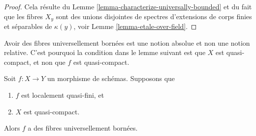 \begin{proof}
Cela résulte du
Lemme \ref{lemma-characterize-universally-bounded} et du fait que les fibres
$X_y$ sont des unions disjointes de spectres d'extensions
de corps finies et séparables de $\kappa(y)$,
voir Lemme \ref{lemma-etale-over-field}.
\end{proof}

\noindent
Avoir des fibres universellement bornées est une notion absolue et non une notion relative.
C'est pourquoi la condition dans le lemme suivant est que $X$ est quasi-compact,
et non que $f$ est quasi-compact.

\begin{lemma}
\label{lemma-locally-quasi-finite-qc-source-universally-bounded}
Soit $f : X \to Y$ un morphisme de schémas. Supposons
que
\begin{enumerate}
\item $f$ est localement quasi-fini, et
\item $X$ est quasi-compact.
\end{enumerate}
Alors $f$ a des fibres universellement bornées.
\end{lemma}


